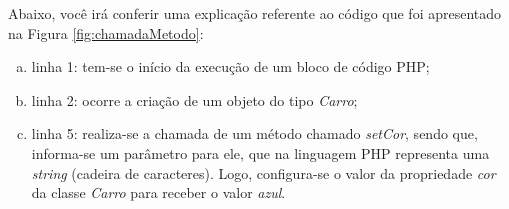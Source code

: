 \FloatBarrier 	%

Abaixo, você irá conferir uma explicação referente ao código que foi
apresentado na Figura \ref{fig:chamadaMetodo}:

\begin{enumerate}[a)]
    \item linha 1: tem-se o início da execução de um bloco de código
    PHP;
    \item linha 2: ocorre a criação de um objeto do tipo \textit{Carro};
    \item linha 5: realiza-se a chamada de um método chamado
    \textit{setCor}, sendo que, informa-se um parâmetro para ele, que na
    linguagem \acs{PHP} representa uma \textit{string} (cadeira de caracteres). Logo,
    configura-se o valor da propriedade \textit{cor} da classe \textit{Carro}
    para receber o valor \textit{azul}.
\end{enumerate}
